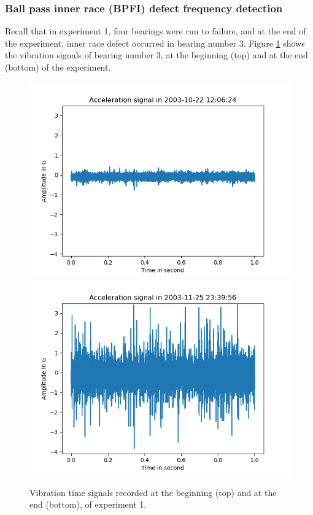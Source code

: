 \documentclass[../Main/thesis.tex]{subfiles}
\begin{document}
\subsubsection{Ball pass inner race (BPFI) defect frequency detection}
Recall that in experiment 1, four bearings were run to failure, and at the end of the experiment, inner race defect occurred in bearing number 3. Figure \ref{fig:bpfi_signal} shows the vibration signals of bearing number 3, at the beginning (top) and at the end (bottom) of the experiment.
\begin{figure}[H]
	\centering
	\includegraphics[width=0.7\linewidth]{../fig/bpfi/first_day_signal}
	\includegraphics[width=0.7\linewidth]{../fig/bpfi/last_day_signal}
	\caption{Vibration time signals recorded at the beginning (top) and at the end (bottom), of experiment 1.}
	\label{fig:bpfi_signal}
\end{figure}
\end{document}
